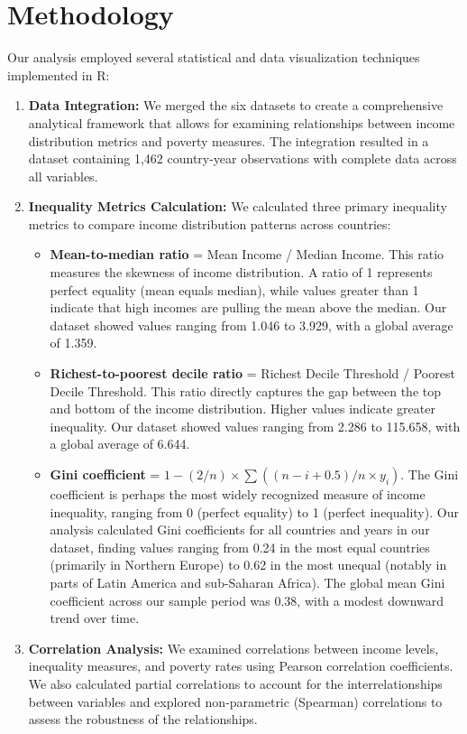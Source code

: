 \documentclass[12pt,a4paper]{article}
\begin{document}
\section{Methodology}\label{sec:methodology}
Our analysis employed several statistical and data visualization techniques implemented in R:
\begin{enumerate}
    \item \textbf{Data Integration:} We merged the six datasets to create a comprehensive analytical framework that allows for examining relationships between income distribution metrics and poverty measures. The integration resulted in a dataset containing 1,462 country-year observations with complete data across all variables.
    \item \textbf{Inequality Metrics Calculation:} We calculated three primary inequality metrics to compare income distribution patterns across countries: 
    \begin{itemize}
        \item \textbf{Mean-to-median ratio} = Mean Income / Median Income. This ratio measures the skewness of income distribution. A ratio of 1 represents perfect equality (mean equals median), while values greater than 1 indicate that high incomes are pulling the mean above the median. Our dataset showed values ranging from 1.046 to 3.929, with a global average of 1.359.
        \item \textbf{Richest-to-poorest decile ratio} = Richest Decile Threshold / Poorest Decile Threshold. This ratio directly captures the gap between the top and bottom of the income distribution. Higher values indicate greater inequality. Our dataset showed values ranging from 2.286 to 115.658, with a global average of 6.644.
        \item \textbf{Gini coefficient} = $1 - (2/n) \times \sum((n-i+0.5)/n \times y_i)$. The Gini coefficient is perhaps the most widely recognized measure of income inequality, ranging from 0 (perfect equality) to 1 (perfect inequality). Our analysis calculated Gini coefficients for all countries and years in our dataset, finding values ranging from 0.24 in the most equal countries (primarily in Northern Europe) to 0.62 in the most unequal (notably in parts of Latin America and sub-Saharan Africa). The global mean Gini coefficient across our sample period was 0.38, with a modest downward trend over time.
    \end{itemize}
    \item \textbf{Correlation Analysis:} We examined correlations between income levels, inequality measures, and poverty rates using Pearson correlation coefficients. We also calculated partial correlations to account for the interrelationships between variables and explored non-parametric (Spearman) correlations to assess the robustness of the relationships.

\end{enumerate}
\end{document}
